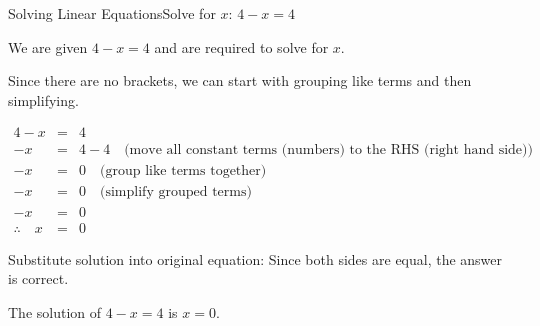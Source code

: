 \documentclass[10pt,a4paper,titlepage,twoside,openright]{report}
\begin{document}
\begin{wex}{Solving Linear Equations}{Solve for $x$: $4-x=4$}{
We are given $4-x=4$ and are required to solve for $x$.

Since there are no brackets, we can start with grouping like terms and then
simplifying.

\begin{eqnarray*}
4-x&=&4\\
-x&=&4-4\quad\mbox{(move all constant terms (numbers) to the RHS (right hand
side))}\\
-x&=&0\quad\mbox{(group like terms together)}\\
-x&=&0\quad\mbox{(simplify grouped terms)}\\
-x&=&0\\
\therefore\quad x&=&0
\end{eqnarray*}

Substitute solution into original equation:
Since both sides are equal, the answer is correct.

The solution of $4-x=4$ is $x=0$.}
\end{wex}
\end{document}
